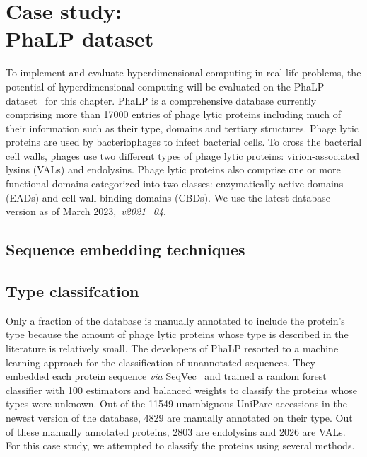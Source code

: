 \chapter[Case study: PhaLP dataset]{Case study: \\PhaLP dataset}
To implement and evaluate hyperdimensional computing in real-life problems, the potential of hyperdimensional computing will be evaluated on the PhaLP dataset~\cite{phalp} for this chapter. PhaLP is a comprehensive database currently comprising more than 17000 entries of phage lytic proteins including much of their information such as their type, domains and tertiary structures. Phage lytic proteins are used by bacteriophages to infect bacterial cells. To cross the bacterial cell walls, phages use two different types of phage lytic proteins: virion-associated lysins (VALs) and endolysins. Phage lytic proteins also comprise one or more functional domains categorized into two classes: enzymatically active domains (EADs) and cell wall binding domains (CBDs). We use the latest database version as of March 2023,~\textit{v2021\_04}.

\section{Sequence embedding techniques}


\section{Type classifcation}
Only a fraction of the database is manually annotated to include the protein's type because the amount of phage lytic proteins whose type is described in the literature is relatively small. The developers of PhaLP resorted to a machine learning approach for the classification of unannotated sequences. They embedded each protein sequence \textit{via} SeqVec~\cite{seqvec} and trained a random forest classifier with 100 estimators and balanced weights to classify the proteins whose types were unknown. Out of the 11549 unambiguous UniParc accessions in the newest version of the database, 4829 are manually annotated on their type. Out of these manually annotated proteins, 2803 are endolysins and 2026 are VALs. For this case study, we attempted to classify the proteins using several methods.

